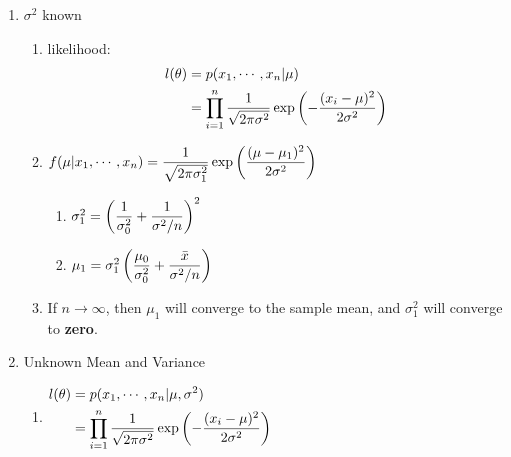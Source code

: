 \begin{enumerate}[itemsep=0.2cm]
    \item $\sigma^2$ known \cite{ism-1}
    \begin{enumerate}[itemsep=0.2cm]
        \item likelihood: 
        \[
        \begin{aligned}
            l(\theta)
            &= p(x_1, \cdots, x_n|\mu) \\
            &= \displaystyle\prod_{i=1}^{n} 
                \dfrac{1}{\sqrt{2\pi\sigma^2}}
                \exp\left(
                    -\dfrac{(x_i - \mu)^2}{2\sigma^2}
                \right)
        \end{aligned}
        \]

        \item $
            f(\mu|x_1, \cdots, x_n) 
            = \dfrac{1}{\sqrt{2\pi\sigma_1^2}}
                \exp\left(
                    \dfrac{(\mu - \mu_1)^2}{2\sigma^2}
                \right)
        $
        \begin{enumerate}[itemsep=0.2cm]
            \item $
                \sigma_1^2
                = \left(
                    \dfrac{1}{\sigma_0^2} +
                    \dfrac{1}{\sigma^2/n}
                \right)^2
            $

            \item $
                \mu_1
                = \sigma_1^2\left(
                    \dfrac{\mu_0}{\sigma_0^2} +
                    \dfrac{\bar{x}}{\sigma^2/n}
                \right)
            $
        \end{enumerate}

        \item If $n \to \infty$, then $\mu_1$ will converge to the sample mean, and $\sigma_1^2$ will converge to \textbf{zero}.
        
    \end{enumerate}

    \item Unknown Mean and Variance \cite{ism-1}
    \begin{enumerate}[itemsep=0.2cm]
        \item $\begin{aligned}
            l(\theta)
            &= p(x_1, \cdots, x_n|\mu, \sigma^2) \\
            &= \displaystyle\prod_{i=1}^{n} 
                \dfrac{1}{\sqrt{2\pi\sigma^2}}
                \exp\left(
                    -\dfrac{(x_i - \mu)^2}{2\sigma^2}
                \right)
        \end{aligned}$


\end{enumerate}
\end{enumerate}

